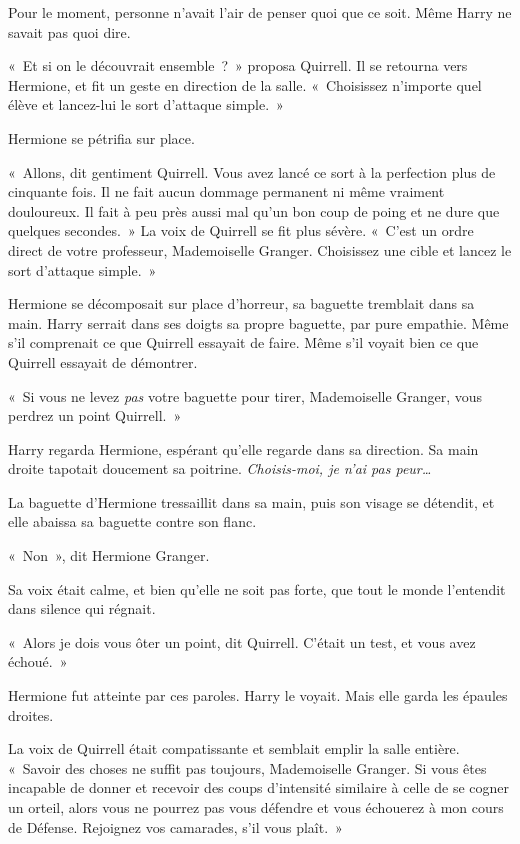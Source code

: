 Pour le moment, personne n'avait l'air de penser quoi que ce soit.
Même Harry ne savait pas quoi dire.

«~Et si on le découvrait ensemble~?~» proposa Quirrell.
Il se retourna vers Hermione, et fit un geste en direction de la salle.
«~Choisissez n'importe quel élève et lancez-lui le sort d'attaque simple.~»

Hermione se pétrifia sur place.

«~Allons, dit gentiment Quirrell.
Vous avez lancé ce sort à la perfection plus de cinquante fois.
Il ne fait aucun dommage permanent ni même vraiment douloureux.
Il fait à peu près aussi mal qu'un bon coup de poing et ne dure que quelques secondes.~»
La voix de Quirrell se fit plus sévère.
«~C'est un ordre direct de votre professeur, Mademoiselle Granger.
Choisissez une cible et lancez le sort d'attaque simple.~»

Hermione se décomposait sur place d'horreur, sa baguette tremblait dans sa main.
Harry serrait dans ses doigts sa propre baguette, par pure empathie.
Même s'il comprenait ce que Quirrell essayait de faire.
Même s'il voyait bien ce que Quirrell essayait de démontrer.

«~Si vous ne levez \emph{pas} votre baguette pour tirer, Mademoiselle Granger, vous perdrez un point Quirrell.~»

Harry regarda Hermione, espérant qu'elle regarde dans sa direction.
Sa main droite tapotait doucement sa poitrine.
\emph{Choisis-moi, je n'ai pas peur…}

La baguette d'Hermione tressaillit dans sa main, puis son visage se détendit, et elle abaissa sa baguette contre son flanc.

«~Non~», dit Hermione Granger.

Sa voix était calme, et bien qu'elle ne soit pas forte, que tout le monde l'entendit dans silence qui régnait.

«~Alors je dois vous ôter un point, dit Quirrell.
C'était un test, et vous avez échoué.~»

Hermione fut atteinte par ces paroles.
Harry le voyait.
Mais elle garda les épaules droites.

La voix de Quirrell était compatissante et semblait emplir la salle entière.
«~Savoir des choses ne suffit pas toujours, Mademoiselle Granger.
Si vous êtes incapable de donner et recevoir des coups d'intensité similaire à celle de se cogner un orteil, alors vous ne pourrez pas vous défendre et vous échouerez à mon cours de Défense.
Rejoignez vos camarades, s'il vous plaît.~»

